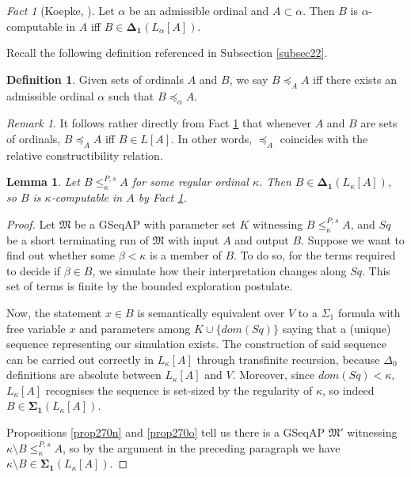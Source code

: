 \documentclass[12pt, twoside]{memoir}
\numberwithin{equation}{section}
\newtheorem{lem}[thm]{Lemma}
\theoremstyle{definition}
\newtheorem{defi}[thm]{Definition}
\theoremstyle{remark}
\newtheorem{rem}[thm]{Remark}
\newtheorem{fact}[thm]{Fact}
\theoremstyle{definition}
\theoremstyle{definition}
\theoremstyle{definition}
\theoremstyle{remark}
\begin{document}
\begin{fact}[Koepke, \cite{koepke2}]\label{fact334}
Let $\alpha$ be an admissible ordinal and $A \subset \alpha$. Then $B$ is $\alpha$-computable in $A$ iff $B \in \mathbf{\Delta_1}(L_{\alpha}[A])$.
\end{fact}

Recall the following definition referenced in Subsection \ref{subsec22}.

\begin{defi}
Given sets of ordinals $A$ and $B$, we say $B \preceq_A A$ iff there exists an admissible ordinal $\alpha$ such that $B \preceq_{\alpha} A$.
\end{defi}

\begin{rem}\label{rem336}
It follows rather directly from Fact \ref{fact334} that whenever $A$ and $B$ are sets of ordinals, $B \preceq_A A$ iff $B \in L[A]$. In other words, $\preceq_A$ coincides with the relative constructibility relation.
\end{rem}

\begin{lem}\label{lem269}
Let $B \leq^{P, s}_{\kappa} A$ for some regular ordinal $\kappa$. Then $B \in \mathbf{\Delta_1}(L_{\kappa}[A])$, so $B$ is $\kappa$-computable in $A$ by Fact \ref{fact334}.
\end{lem}

\begin{proof}
Let $\mathfrak{M}$ be a GSeqAP with parameter set $K$ witnessing $B \leq^{P, s}_{\kappa} A$, and $Sq$ be a short terminating run of $\mathfrak{M}$ with input $A$ and output $B$. Suppose we want to find out whether some $\beta < \kappa$ is a member of $B$. To do so, for the terms required to decide if $\beta \in B$, we simulate how their interpretation changes along $Sq$. This set of terms is finite by the bounded exploration postulate. 

Now, the statement $x \in B$ is semantically equivalent over $V$ to a $\Sigma_1$ formula with free variable $x$ and parameters among $K \cup \{dom(Sq)\}$ saying that a (unique) sequence representing our simulation exists. The construction of said sequence can be carried out correctly in $L_{\kappa}[A]$ through transfinite recursion, because $\Delta_0$ definitions are absolute between $L_{\kappa}[A]$ and $V$. Moreover, since $dom(Sq)  < \kappa$, $L_{\kappa}[A]$ recognises the sequence is set-sized by the regularity of $\kappa$, so indeed $B \in \mathbf{\Sigma_1}(L_{\kappa}[A])$.

Propositions \ref{prop270n} and \ref{prop270o} tell us there is a GSeqAP $\mathfrak{M}'$ witnessing $\kappa \setminus B \leq^{P, s}_{\kappa} A$, so by the argument in the preceding paragraph we have $\kappa \setminus B \in \mathbf{\Sigma_1}(L_{\kappa}[A])$.
\end{proof}
\end{document}
